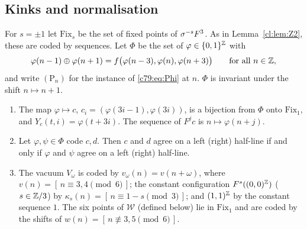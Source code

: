 \subsection{Kinks and normalisation}\label{c79:sec:kinks}

For $s=\pm1$ let $\mathrm{Fix}_s$ be the set of fixed points of $\sigma^{-s}F^3$. As in Lemma~\ref{cl:lem:Z2}, these are coded by sequences. Let $\Phi$ be the set of $\varphi\in\{0,1\}^{\mathbb{Z}}$ with
\begin{equation}\label{c79:eq:Phi}
\varphi(n-1)\oplus\varphi(n+1)=f\bigl(\varphi(n-3),\varphi(n),\varphi(n+3)\bigr)\qquad\text{for all }n\in\mathbb{Z},
\end{equation}
and write $(\mathrm P_n)$ for the instance of \eqref{c79:eq:Phi} at $n$. $\Phi$ is invariant under the shift $n\mapsto n+1$.

\begin{lemma}\label{c79:lem:phi}
\begin{enumerate}
\item[(a)] The map $\varphi\mapsto c$, $c_i=(\varphi(3i-1),\varphi(3i))$, is a bijection from $\Phi$ onto $\mathrm{Fix}_1$, and $Y_c(t,i)=\varphi(t+3i)$. The sequence of $F^jc$ is $n\mapsto\varphi(n+j)$.
\item[(b)] Let $\varphi,\psi\in\Phi$ code $c,d$. Then $c$ and $d$ agree on a left (right) half-line if and only if $\varphi$ and $\psi$ agree on a left (right) half-line.
\item[(c)] The vacuum $V_\omega$ is coded by $v_\omega(n)=v(n+\omega)$, where $v(n)=[\,n\equiv3,4\pmod 6\,]$; the constant configuration $F^{s}((0,0)^{\mathbb{Z}})$ ($s\in\mathbb{Z}/3$) by $\kappa_s(n)=[\,n\equiv 1-s\pmod 3\,]$; and $(1,1)^{\mathbb{Z}}$ by the constant sequence $1$. The six points of $\mathcal W$ (defined below) lie in $\mathrm{Fix}_1$ and are coded by the shifts of $w(n)=[\,n\not\equiv3,5\pmod 6\,]$.
\end{enumerate}
\end{lemma}

